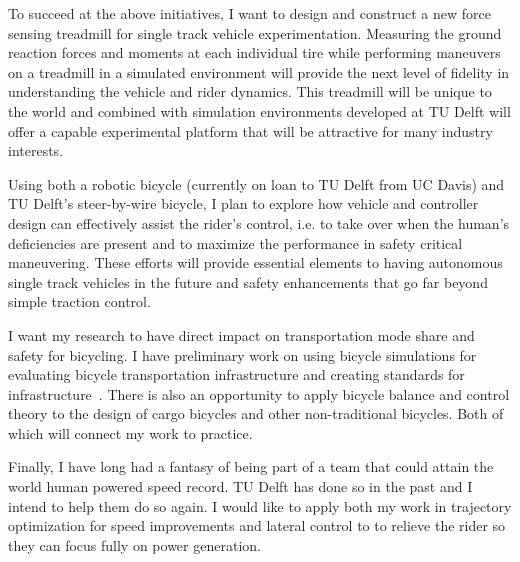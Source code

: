 \documentclass{article}
\begin{document}
To succeed at the above initiatives, I want to design and construct a new force
sensing treadmill for single track vehicle experimentation. Measuring the
ground reaction forces and moments at each individual tire while performing
maneuvers on a treadmill in a simulated environment will provide the next level
of fidelity in understanding the vehicle and rider dynamics. This treadmill
will be unique to the world and combined with simulation environments developed
at TU Delft will offer a capable experimental platform that will be attractive
for many industry interests.

Using both a robotic bicycle (currently on loan to TU Delft from UC Davis) and
TU Delft's steer-by-wire bicycle, I plan to explore how vehicle and controller
design can effectively assist the rider's control, i.e. to take over when the
human's deficiencies are present and to maximize the performance in safety
critical maneuvering. These efforts will provide essential elements to having
autonomous single track vehicles in the future and safety enhancements that go
far beyond simple traction control.

I want my research to have direct impact on transportation mode share and
safety for bicycling. I have preliminary work on using bicycle simulations for
evaluating bicycle transportation infrastructure and creating standards for
infrastructure~\cite{Buehler2012}. There is also an opportunity to apply
bicycle balance and control theory to the design of cargo bicycles and other
non-traditional bicycles. Both of which will connect my work to practice.

Finally, I have long had a fantasy of being part of a team that could attain
the world human powered speed record. TU Delft has done so in the past and I
intend to help them do so again. I would like to apply both my work in
trajectory optimization for speed improvements and lateral control to to
relieve the rider so they can focus fully on power generation.




\end{document}
